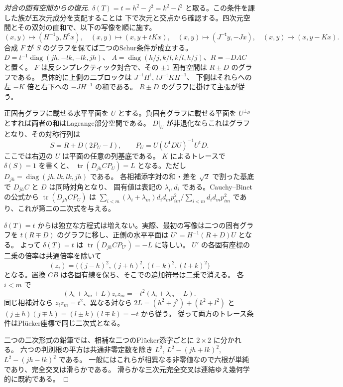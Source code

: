 \begin{proof}[対合の固有空間からの復元]
$\delta(T)=t=h^2-j^2=k^2-l^2$ と取る。この条件を課した族が五次元成分を支配することは
下で次元と交点から確認する。四次元空間とその双対の直和で、以下の写像を順に施す。
\[
 (x,y)\mapsto(H^{-1}y,H^{\mathsf t}x),\quad
 (x,y)\mapsto(x,y+tKx),\quad
 (x,y)\mapsto(J^{-\mathsf t}y,-Jx),\quad
 (x,y)\mapsto(x,y-Kx).
\]
合成 $F$ が $S$ のグラフを保てば二つのSchur条件が成立する。
$D=t^{-1}\operatorname{diag}(jh,-lk,-lk,jh)$、
$A=\operatorname{diag}(h/j,k/l,k/l,h/j)$、$R=-DAC$ と置く。
$F$ は反シンプレクティック対合で、その $\pm1$ 固有空間は $R\pm D$ のグラフである。
具体的に上側の二ブロックは $J^{-\mathsf t}H^{\mathsf t}$, $tJ^{-\mathsf t}KH^{-1}$、
下側はそれらへの左 $-K$ 倍と右下への $-JH^{-1}$ の和である。
$R\pm D$ のグラフに掛けて主張が従う。

正固有グラフに載せる水平平面を $U$ とする。負固有グラフに載せる平面を
$U^{\perp_D}$ とすれば両者の和はLagrange部分空間である。
$D|_U$ が非退化ならこれはグラフとなり、その対称行列は
\[
 S=R+D(2P_U-I),\qquad P_U=U(U^{\mathsf t}DU)^{-1}U^{\mathsf t}D .
\]
ここでは右辺の $U$ は平面の任意の列基底である。
$K$ によるトレースで $\delta(S)=1$ を書くと、
$\operatorname{tr}(D_{jh} C P_U)=L$ となる。ただし
$D_{jh}=\operatorname{diag}(jh,lk,lk,jh)$ である。
各相補添字対の和・差を $\sqrt2$ で割った基底で $D_{jh}C$ と $D$ は同時対角となり、
固有値は表記の $\lambda_i,d_i$ である。Cauchy--Binetの公式から
$\operatorname{tr}(D_{jh}CP_U)$ は
$\sum_{i<m}(\lambda_i+\lambda_m)d_i d_m p_{im}^2/\sum_{i<m}d_i d_m p_{im}^2$
であり、これが第二の二次式を与える。

$\delta(T)=t$ からは独立な方程式は増えない。実際、最初の写像は二つの固有グラフを
$t(R\mp D)$ のグラフに移し、正側の水平平面は $U'=H^{-1}(R+D)U$ となる。
よって $\delta(T)=t$ は $\operatorname{tr}(D_{jh}CP_{U'})=-L$ に等しい。
$U'$ の各固有座標の二乗の倍率は共通倍率を除いて
\[
 (z_i)=\big((j-h)^2,(j+h)^2,(l-k)^2,(l+k)^2\big)
\]
となる。置換 $CB$ は各固有線を保ち、そこでの追加符号は二乗で消える。
各 $i<m$ で
\[
 (\lambda_i+\lambda_m+L)z_i z_m=-t^2(\lambda_i+\lambda_m-L).
\]
同じ相補対なら $z_i z_m=t^2$、異なる対なら
$2L=(h^2+j^2)+(k^2+l^2)$ と $(j\pm h)(j\mp h)=(l\pm k)(l\mp k)=-t$ から従う。
従って両方のトレース条件はPlücker座標で同じ二次式となる。

二つの二次形式の鉛筆では、相補な二つのPlücker添字ごとに $2\times2$ に分かれる。
六つの判別根の平方は共通非零定数を除き
$L^2$, $L^2-(jh+lk)^2$, $L^2-(jh-lk)^2$ である。
一般にはこれらが相異なる非零値なので六根が単純であり、完全交叉は滑らかである。
滑らかな三次元完全交叉は連結ゆえ幾何学的に既約である。
\end{proof}

